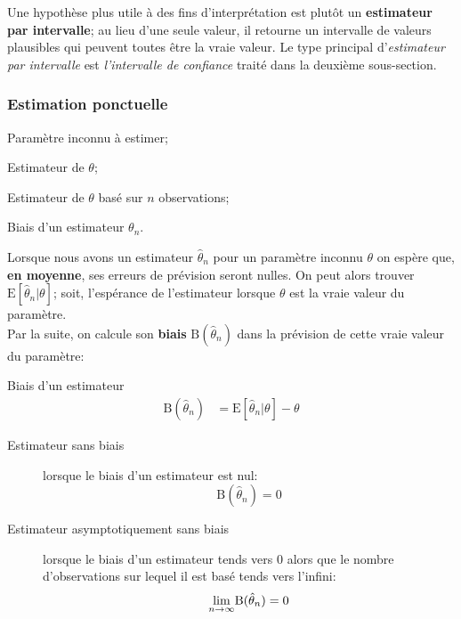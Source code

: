 \documentclass[10pt, french]{article}
\begin{document}
\begin{multicols*}{2}
Une hypothèse plus utile à des fins d'interprétation est plutôt un \textbf{estimateur par intervalle}; au lieu d'une seule valeur, il retourne un intervalle de valeurs plausibles qui peuvent toutes être la vraie valeur. 
Le type principal d'\textit{estimateur par intervalle} est \textit{l'intervalle de confiance} traité dans la deuxième sous-section.

\subsubsection*{Estimation ponctuelle}

\begin{distributions}[Notation]
\begin{description}[font = \normalfont]
	\item[$\theta$]	Paramètre inconnu à estimer;
	\item[$\hat{\theta}$]	Estimateur de $\theta$;
	\item[$\hat{\theta}_{n}$]	Estimateur de $\theta$ basé sur $n$ observations;
	\item[$\text{B}(\hat{\theta}_{n})$]	Biais d'un estimateur $\theta_{n}$.
\end{description}
\end{distributions}

Lorsque nous avons un estimateur $\hat{\theta}_{n}$ pour un paramètre inconnu $\theta$ on espère que, \textbf{en moyenne}, ses erreurs de prévision seront nulles. 
On peut alors trouver $\text{E}[\hat{\theta}_{n} | \theta]$; soit, l'espérance de l'estimateur lorsque $\theta$ est la vraie valeur du paramètre.	\\
Par la suite, on calcule son \textbf{biais} $\text{B}(\hat{\theta}_{n})$ dans la prévision de cette vraie valeur du paramètre:
\begin{algo}{Biais d'un estimateur}
\begin{align*}
	\text{B}(\hat{\theta}_{n}) 
	&= 	\text{E}[\hat{\theta}_{n} | \theta] - \theta
\end{align*}
\tcbline
\begin{description}
	\item[Estimateur sans biais]	lorsque le biais d'un estimateur est nul:
		 \[
		 	\text{B}(\hat{\theta}_{n}) = 0
		 \]
	\item[Estimateur asymptotiquement sans biais]	lorsque le biais d'un estimateur tends vers 0 alors que le nombre d'observations sur lequel il est basé tends vers l'infini: 
		\[
			\underset{n \rightarrow \infty}{\lim}\text{B}(\hat{\theta}_{n}) = 0
		\]
\end{description}
\end{algo}


\end{multicols*}
\end{document}
